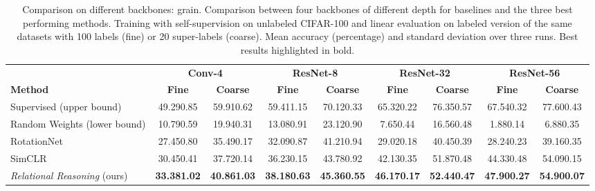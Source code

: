 \documentclass{article}
\begin{document}
\begin{table}[H]
 \caption{Comparison on different backbones: grain. Comparison between four backbones of different depth for baselines and the three best performing methods. Training with self-supervision on unlabeled CIFAR-100 and linear evaluation on labeled version of the same datasets with 100 labels (fine) or 20 super-labels (coarse). Mean accuracy (percentage) and standard deviation over three runs. Best results highlighted in bold.}
 \label{tab:backbones_grain}
 \begin{adjustbox}{width=1.0\columnwidth,center}
  \centering
  \begin{tabular}{lcccccccc}
    \toprule
     & \multicolumn{2}{c}{\textbf{Conv-4}} & \multicolumn{2}{c}{\textbf{ResNet-8}} & \multicolumn{2}{c}{\textbf{ResNet-32}} & \multicolumn{2}{c}{\textbf{ResNet-56}}\\
    \cmidrule[0.1pt](r){2-3} \cmidrule[0.1pt](l){4-5} \cmidrule[0.1pt](l){6-7} \cmidrule[0.1pt](l){8-9}
    \textbf{Method} &
    \textbf{Fine} & \textbf{Coarse} &
    \textbf{Fine} & \textbf{Coarse} &
    \textbf{Fine} & \textbf{Coarse} &
    \textbf{Fine} & \textbf{Coarse} \\
    \midrule
    Supervised (upper bound) & 
    49.29\small{0.85} & 59.91\small{0.62} & 
    59.41\small{1.15} & 70.12\small{0.33} & 
    65.32\small{0.22} & 76.35\small{0.57} & 
    67.54\small{0.32} & 77.60\small{0.43} \\
    Random Weights (lower bound) & 
    10.79\small{0.59} & 19.94\small{0.31} & 
    13.08\small{0.91} & 23.12\small{0.90} & 
     7.65\small{0.44} & 16.56\small{0.48} &  
     1.88\small{0.14} &  6.88\small{0.35} \\
    \cmidrule(l){1-9}
    RotationNet \citep{gidaris2018unsupervised} & 
    27.45\small{0.80} & 35.49\small{0.17} & 
    32.09\small{0.87} & 41.21\small{0.94} & 
    29.02\small{0.18} & 40.45\small{0.39} & 
    28.24\small{0.23} & 39.16\small{0.35} \\
    SimCLR \citep{chen2020simple} & 
    30.45\small{0.41} & 37.72\small{0.14} & 
    36.23\small{0.15} & 43.78\small{0.92} & 
    42.13\small{0.35} & 51.87\small{0.48} & 
    44.33\small{0.48} & 54.09\small{0.15} \\    
    \emph{Relational Reasoning} (ours) & 
    \textbf{33.38\small{1.02}} & \textbf{40.86\small{1.03}} & 
    \textbf{38.18\small{0.63}} & \textbf{45.36\small{0.55}} & 
    \textbf{46.17\small{0.17}} & \textbf{52.44\small{0.47}} & 
    \textbf{47.90\small{0.27}} & \textbf{54.90\small{0.07}} \\
    \bottomrule
  \end{tabular}
 \end{adjustbox}
\end{table}
\end{document}
